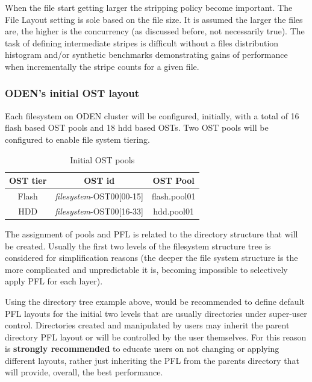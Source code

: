 \documentclass{article}
\begin{document}
When the file start getting larger the stripping policy become important. The File Layout setting is sole based on the file size. It is assumed the larger the files are, the higher is the concurrency (as discussed before, not necessarily true). The task of defining intermediate stripes is difficult without a files distribution histogram and/or synthetic benchmarks demonstrating gains of performance when incrementally the stripe counts for a given file.

\subsubsection{ODEN's initial OST layout}
Each filesystem on ODEN cluster will be configured, initially, with a total of 16 flash based OST pools and 18 hdd based OSTs. Two OST pools will be configured to enable file system tiering. 

\begin{table}[h]
\centering
 \begin{tabular}{||c c c||} 
 \hline
 OST tier & OST id & OST Pool \\ [0.5ex] 
 \hline\hline
 Flash &\textit{filesystem}-OST00[00-15] & flash.pool01 \\ 
 \hline
HDD & \textit{filesystem}-OST00[16-33] & hdd.pool01 \\ 
 \hline
 \end{tabular}
 \caption{Initial OST pools}
 \label{tab:initial-ost-pools}
\end{table}

The assignment of pools and PFL is related to the directory structure that will be created. Usually the first two levels of the filesystem structure tree is considered for simplification reasons (the deeper the file system structure is the more complicated and unpredictable it is, becoming impossible to selectively apply PFL for each layer). 
\vspace{5mm}

Using the directory tree example above, would be recommended to define default PFL layouts for the initial two levels that are usually directories under super-user control. Directories created and manipulated by users may inherit the parent directory PFL layout or will be controlled by the user themselves. For this reason is \textbf{strongly recommended} to educate users on not changing or applying different layouts, rather just inheriting the PFL from the parents directory that will provide, overall, the best performance.
\end{document}
